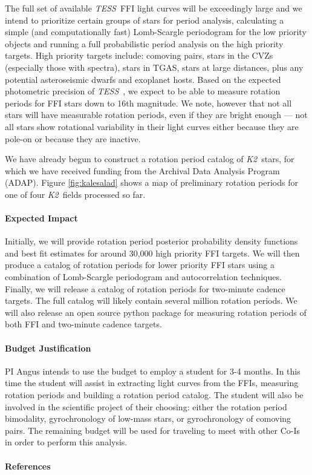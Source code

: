 \documentclass[letterpaper,12pt,preprint]{hack_aastex}
\newcommand{\Ktwo}{{\it K2}}
\newcommand{\ktwo}{\Ktwo}
\newcommand{\TESS}{{\it TESS}}
\newcommand{\tess}{{\it TESS}}
\begin{document}
The full set of available \TESS\ FFI light curves will be exceedingly large
and we intend to prioritize certain groups of stars for period analysis,
calculating a simple (and computationally fast) Lomb-Scargle periodogram for
the low priority objects and running a full probabilistic period analysis on
the high priority targets.
High priority targets include: comoving pairs, stars in the CVZs (especially
those with spectra), stars in TGAS, stars at large distances, plus any
potential asteroseismic dwarfs and exoplanet hosts.
Based on the expected photometric precision of \tess\ \citep{sullivan2015}, we
expect to be able to measure rotation periods for FFI stars down to 16th
magnitude.
We note, however that not all stars will have measurable rotation periods,
even if they are bright enough --- not all stars show rotational variability
in their light curves either because they are pole-on or because they are
inactive.

We have already begun to construct a rotation period catalog of \ktwo\ stars,
for which we have received funding from the Archival Data Analysis Program
(ADAP).
Figure \ref{fig:kalesalad} shows a map of preliminary rotation periods for one
of four \ktwo\ fields processed so far.


\paragraph{Expected Impact}
Initially, we will provide rotation period posterior probability density
functions and best fit estimates for around 30,000 high priority FFI targets.
We will then produce a catalog of rotation periods for lower priority FFI
stars using a combination of Lomb-Scargle periodogram and autocorrelation
techniques.
Finally, we will release a catalog of rotation periods for two-minute cadence
targets.
The full catalog will likely contain several million rotation periods.
We will also release an open source python package for measuring rotation
periods of both FFI and two-minute cadence targets.

\paragraph{Budget Justification}
PI Angus intends to use the budget to employ a student for 3-4 months.
In this time the student will assist in extracting light curves from the FFIs,
measuring rotation periods and building a rotation period catalog.
The student will also be involved in the scientific project of their choosing:
either the rotation period bimodality, gyrochronology of low-mass stars, or
gyrochronology of comoving pairs.
The remaining budget will be used for traveling to meet with other Co-Is in
order to perform this analysis.
\paragraph{References}

{\footnotesize

}
\end{document}

